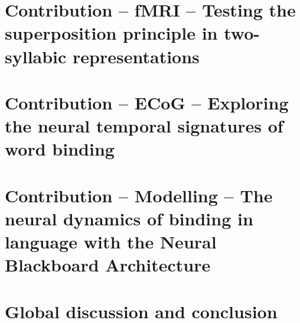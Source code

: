 \documentclass[twoside, justified, notoc, nobib, 
	nohyper]{tufte-book}
\begin{document}
\part{Contribution -- fMRI -- Testing the superposition principle in two-syllabic representations}
\cleardoublepage

\FloatBarrier

\FloatBarrier

\FloatBarrier
% 


\part{Contribution -- ECoG -- Exploring the neural temporal signatures of word binding}
\cleardoublepage
% 
% 
% 
% 


\part{Contribution -- Modelling -- The neural dynamics of binding in language with the Neural Blackboard Architecture}
\cleardoublepage
% 
% 
% 
% 


\part{Global discussion and conclusion}
\cleardoublepage
%
%
\cleardoublepage


\backmatter 



\clearpage
%
\end{document}
